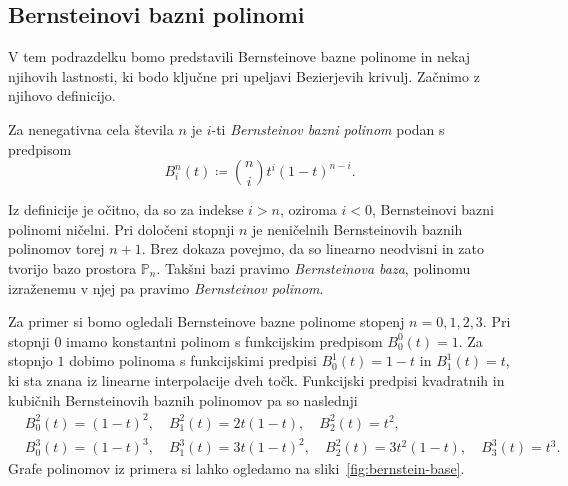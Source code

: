 \documentclass[isrm2, tisk]{fmfdelo}
\newcommand{\bernstein}[2]{\binom{#1}{#2}t^{#2}(1-t)^{#1-#2}}
\begin{document}
    \subsection{Bernsteinovi bazni polinomi}\label{subsec:bernsteinovi-polinomi}
    V tem podrazdelku bomo predstavili Bernsteinove bazne polinome in nekaj njihovih lastnosti, ki bodo ključne pri upeljavi Bezierjevih krivulj.
    Začnimo z njihovo definicijo.
    \begin{definicija}
        \label{def:bernstein}
        Za nenegativna cela števila $n$ je $i$-ti \textit{Bernsteinov bazni polinom} podan s predpisom \[B_i^n(t)\coloneqq\bernstein{n}{i}.\]
    \end{definicija}
    Iz definicije je očitno, da so za indekse $i>n$, oziroma $i<0$, Bernsteinovi bazni polinomi ničelni.
    Pri določeni stopnji $n$ je neničelnih Bernsteinovih baznih polinomov torej $n+1$.
    Brez dokaza povejmo, da so linearno neodvisni in zato tvorijo bazo prostora $\mathbb{P}_n$.
    Takšni bazi pravimo \textit{Bernsteinova baza}, polinomu izraženemu v njej pa pravimo \textit{Bernsteinov polinom}.
    \begin{primer}
        \label{primer:bernsteinovi}
        Za primer si bomo ogledali Bernsteinove bazne polinome stopenj $n=0,1,2,3$.
        Pri stopnji $0$ imamo konstantni polinom s funkcijskim predpisom $B_{0}^{0}(t) = 1$.
        Za stopnjo $1$ dobimo polinoma s funkcijskimi predpisi $B_{0}^{1}(t) = 1-t$ in $B_{1}^{1}(t) = t$, ki sta znana iz linearne interpolacije dveh točk.
        Funkcijski predpisi kvadratnih in kubičnih Bernsteinovih baznih polinomov pa so naslednji
        \begin{align*}
            &B_{0}^{2}(t) = (1-t)^2,\quad B_{1}^{2}(t) = 2t(1-t),\quad B_{2}^{2}(t) = t^2,  \\
            &B_{0}^{3}(t) = (1-t)^3,\quad B_{1}^{3}(t) = 3t(1-t)^2,\quad B_{2}^{2}(t) = 3t^2(1-t),\quad B_{3}^{3}(t) = t^3.
        \end{align*}
        Grafe polinomov iz primera si lahko ogledamo na sliki~\ref{fig:bernstein-base}.
    \end{primer}
\end{document}
